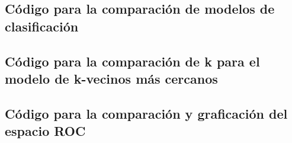 \documentclass[sigconf,authorversion,nonacm]{acmart}
\begin{document}



\clearpage

\appendix

\lstset{style=customstyle}

\begin{figure*}
  \section{Código para la comparación de modelos de clasificación}
  \label{appendix:py}
  
\end{figure*}

\begin{figure*}
  
\end{figure*}

\begin{figure*}
  \section{Código para la comparación de k para el modelo de k-vecinos más cercanos}
  \label{appendix:knnpy}
  
\end{figure*}

\begin{figure*}
  \section{Código para la comparación y graficación del espacio ROC}
  \label{appendix:rocpy}
  
\end{figure*}

\begin{figure*}
  
\end{figure*}
\end{document}
